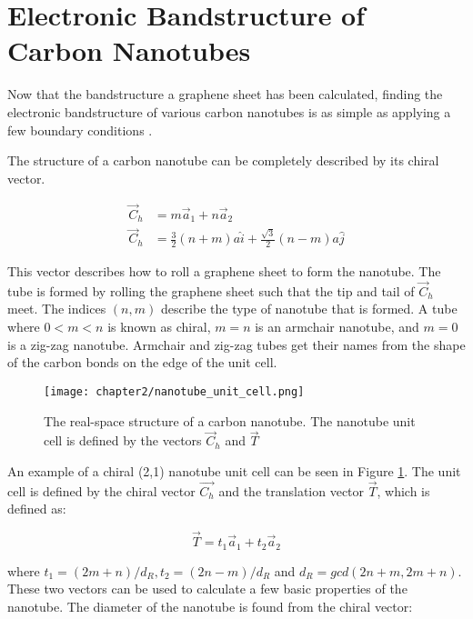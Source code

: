 \section{Electronic Bandstructure of Carbon Nanotubes} 

Now that the bandstructure a graphene sheet has been calculated, finding the electronic bandstructure of various carbon nanotubes is as simple as applying a few boundary conditions \cite{Saito1998, Samsonidze2003, Charlier2007, Javey2009}.

The structure of a carbon nanotube can be completely described by its chiral vector.

\begin{align}
    \vec{C}_h &= m\vec{a}_1 + n\vec{a}_2 \label{eq:chiral_vec} \\
    \vec{C}_h &= \frac{3}{2}(n+m)a\hat{i} + \frac{\sqrt{3}}{2}(n-m)a\hat{j} \nonumber
\end{align}

This vector describes how to roll a graphene sheet to form the nanotube. The tube is formed by rolling the graphene sheet such that the tip and tail of $\vec{C}_h$ meet. The indices $(n,m)$ describe the type of nanotube that is formed. A tube where $0<m<n$ is known as chiral, $m=n$ is an armchair nanotube, and $m=0$ is a zig-zag nanotube. Armchair and zig-zag tubes get their names from the shape of the carbon bonds on the edge of the unit cell.

\begin{figure}
    \centering
    \texttt{[image: chapter2/nanotube\_unit\_cell.png]}
    \caption{The real-space structure of a carbon nanotube. The nanotube unit cell is defined by the vectors $\vec{C}_h$ and $\vec{T}$}
    \label{fig:cnt_unit_cell}
\end{figure}

An example of a chiral (2,1) nanotube unit cell can be seen in Figure \ref{fig:cnt_unit_cell}. The unit cell is defined by the chiral vector $\vec{C_h}$ and the translation vector $\vec{T}$, which is defined as:

\begin{equation}
    \vec{T} = t_1\vec{a}_1 + t_2\vec{a}_2 \label{eq:translation}
\end{equation}
    
where $t_1 = (2m+n)/d_R, t_2 = (2n-m)/d_R$ and $d_R = gcd(2n+m, 2m+n)$. These two vectors can be used to calculate a few basic properties of the nanotube. The diameter of the nanotube is found from the chiral vector:

